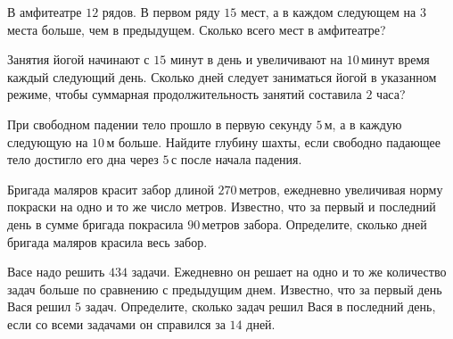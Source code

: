 \begin{class}[number=1]
\begin{listofex}
		\item В амфитеатре \( 12 \) рядов. В первом ряду \( 15 \) мест, а в каждом следующем на \( 3 \) места больше, чем в предыдущем. Сколько всего мест в амфитеатре?
		\item Занятия йогой начинают с \( 15 \) минут в день и увеличивают на \( 10 \) минут время каждый следующий день. Сколько дней следует заниматься йогой в указанном режиме, чтобы суммарная продолжительность занятий составила \( 2 \) часа?
		\item При свободном падении тело прошло в первую секунду \( 5 \) м, а в каждую следующую на \( 10 \) м больше. Найдите глубину шахты, если свободно падающее тело достигло его дна через \( 5 \) с после начала падения.
		\item Бригада маляров красит забор длиной \( 270 \) метров, ежедневно увеличивая норму покраски на одно и то же число метров. Известно, что за первый и последний день в сумме бригада покрасила \( 90 \) метров забора. Определите, сколько дней бригада маляров красила весь забор.
		\item Васе надо решить \( 434 \) задачи. Ежедневно он решает на одно и то же количество задач больше по сравнению с предыдущим днем. Известно, что за первый день Вася решил \( 5 \) задач. Определите, сколько задач решил Вася в последний день, если со всеми задачами он справился за \( 14 \) дней.
	\end{listofex}
\end{class}

